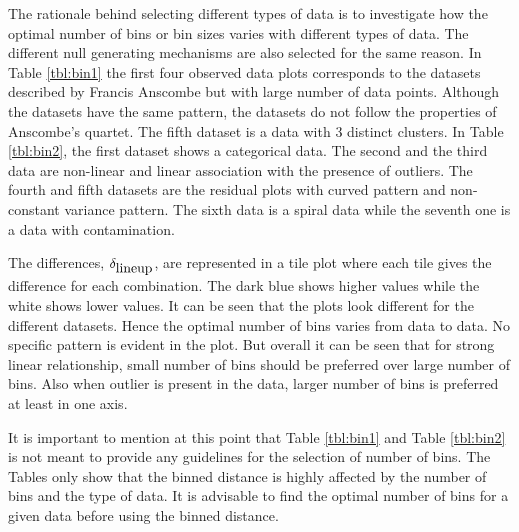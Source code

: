 \documentclass[12]{article}
\begin{document}
The rationale behind selecting different types of data is to investigate how the optimal number of bins or bin sizes varies with different types of data. The different null generating mechanisms are also selected for the same reason. In Table \ref{tbl:bin1} the first four observed data plots corresponds to the datasets described by Francis Anscombe \citep{anscombe:1972} but with large number of data points. Although the datasets have the same pattern, the datasets do not follow the properties of Anscombe's quartet. The fifth dataset is a data with 3 distinct clusters. In Table \ref{tbl:bin2}, the first dataset shows a categorical data. The second and the third data are non-linear and linear association with the presence of outliers. The fourth and fifth datasets are the residual plots with curved pattern and non-constant variance pattern. The sixth data is a spiral data while the seventh one is a data with contamination. 

The differences, $\delta_{\hbox{lineup}}$, are represented in a tile plot where each tile gives the difference for each combination. The dark blue shows higher values while the white shows lower values. It can be seen that the plots look different for the different datasets. Hence the optimal number of bins varies from data to data. No specific pattern is evident in the plot. But overall it can be seen that for strong linear relationship, small number of bins should be preferred over large number of bins. Also when outlier is present in the data, larger number of bins is preferred at least in one axis.

It is important to mention at this point that Table \ref{tbl:bin1} and Table \ref{tbl:bin2} is not meant to provide any guidelines for the selection of number of bins. The Tables only show that the binned distance is highly affected by the number of bins and the type of data. It is advisable to find the optimal number of bins for a given data before using the binned distance.
\end{document}
